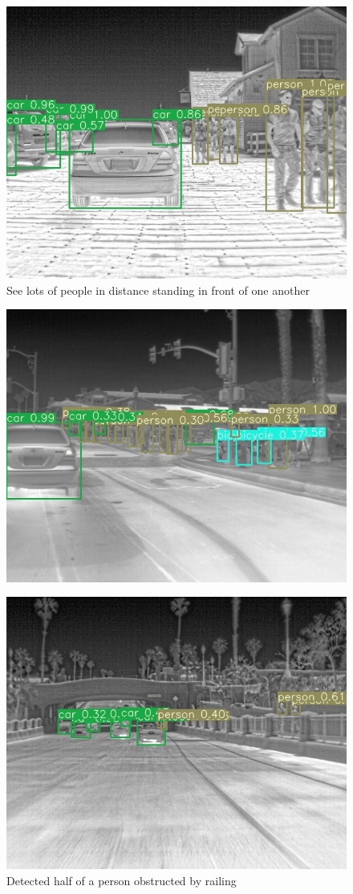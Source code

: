 \documentclass[oneside]{article}
\begin{document}
\begin{figure}
\centering
\includegraphics[width=0.7\linewidth]{images/results-f3}
\caption{See lots of people in distance standing in front of one another}
\label{fig:results-f3}
\end{figure}

\begin{figure}
\centering
\includegraphics[width=0.7\linewidth]{images/results-f4}
\caption{}
\label{fig:results-f4}
\end{figure}

\begin{figure}
\centering
\includegraphics[width=0.7\linewidth]{images/results-f5}
\caption{ Detected half of a person obstructed by railing}
\label{fig:results-f5}
\end{figure}
\end{document}
